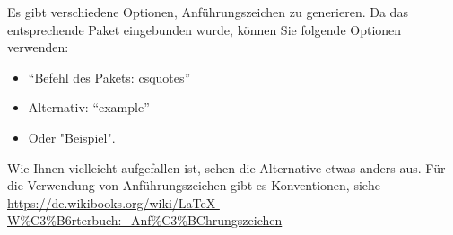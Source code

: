 Es gibt verschiedene Optionen, Anführungszeichen zu generieren. Da das entsprechende Paket eingebunden wurde, können Sie folgende Optionen verwenden:

\begin{itemize}
	\item \enquote{Befehl des Pakets: csquotes}
	\item Alternativ: ``example''
	\item Oder "Beispiel". 
\end{itemize}

Wie Ihnen vielleicht aufgefallen ist, sehen die Alternative etwas anders aus. Für die Verwendung von Anführungszeichen gibt es Konventionen, siehe \url{https://de.wikibooks.org/wiki/LaTeX-W%C3%B6rterbuch:_Anf%C3%BChrungszeichen}





